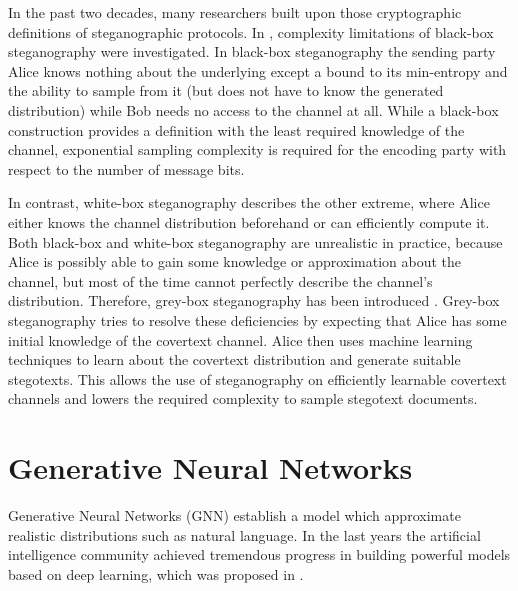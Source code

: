 
In the past two decades, many researchers built upon those cryptographic definitions of steganographic protocols.
In \cite{DIRR2008}, complexity limitations of black-box steganography were investigated.
In black-box steganography the sending party Alice knows nothing about the underlying except a bound to its min-entropy and the ability to sample from it (but does not have to know the generated distribution) while Bob needs no access to the channel at all.
While a black-box construction provides a definition with the least required knowledge of the channel, exponential sampling complexity is required for the encoding party with respect to the number of message bits.

In contrast, white-box steganography describes the other extreme, where Alice either knows the channel distribution beforehand or can efficiently compute it.
Both black-box and white-box steganography are unrealistic in practice, because Alice is possibly able to gain some knowledge or approximation about the channel, but most of the time cannot perfectly describe the channel's distribution.
Therefore, grey-box steganography has been introduced \cite{LRW2013}.
Grey-box steganography tries to resolve these deficiencies by expecting that Alice has some initial knowledge of the covertext channel.
Alice then uses machine learning techniques to learn about the covertext distribution and generate suitable stegotexts.
This allows the use of steganography on efficiently learnable covertext channels and lowers the required complexity to sample stegotext documents.

\section{Generative Neural Networks}
\label{sec:generative-neural-networks}

Generative Neural Networks (GNN) establish a model which approximate realistic distributions such as natural language.
In the last years the artificial intelligence community achieved tremendous progress in building powerful models based on deep learning, which was proposed in \cite{DeepLearning2015}.

